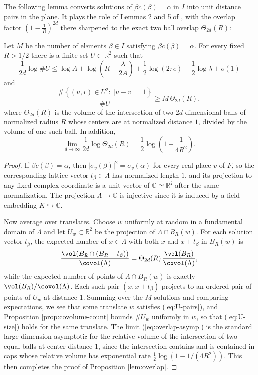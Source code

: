 The following lemma converts solutions of $\beta c(\beta)=\alpha$ in $I$ into unit distance pairs in the plane.  It plays the role of Lemmas 2 and 5 of \cite{Sawin}, with the overlap factor $(1-\frac{1}{R})^{2d}$ there sharpened to the exact two ball overlap $\Theta_{2d}(R)$:
\begin{proposition}\label{lem:overlap}
Let $M$ be the number of elements $\beta\in I$ satisfying $\beta c(\beta)=\alpha$.  For every fixed $R>1/2$ there is a finite set $U\subset\mathbb{R}^2$ such that
\begin{equation}\label{eq:U-size}
  \frac1{2d}\log\#U
  \leq
  \log A+\log\left(R+\frac{\lambda}{2A}\right)
  +\frac12\log(2\pi e)-\frac12\log\lambda+o(1)
\end{equation}
and
\begin{equation}\label{eq:U-pairs}
   \frac{\#\left\{(u,v)\in U^2:\ |u-v|=1\right\}}{\#U}
   \geq M\,\Theta_{2d}(R),
\end{equation}
where $\Theta_{2d}(R)$ is the volume of the intersection of two $2d$-dimensional balls of normalized radius $R$ whose centers are at normalized distance $1$, divided by the volume of one such ball.  In addition,
\begin{equation}\label{eq:overlap-asymp}
   \lim_{d\to\infty}\frac1{2d}\log\Theta_{2d}(R)
   =\frac12\log\left(1-\frac1{4R^2}\right).
\end{equation}
\end{proposition}

\begin{proof}
If $\beta c(\beta)=\alpha$, then $|\sigma_v(\beta)|^2=\sigma_v(\alpha)$ for every real place $v$ of $F$, so the corresponding lattice vector $t_\beta\in\Lambda$ has normalized length $1$, and its projection to any fixed complex coordinate is a unit vector of $\mathbb{C}\simeq\mathbb{R}^2$ after the same normalization.  The projection $\Lambda\to\mathbb{C}$ is injective since it is induced by a field embedding $K\hookrightarrow\mathbb{C}$.

Now average over translates.  Choose $w$ uniformly at random in a fundamental domain of $\Lambda$ and let $U_w\subset\mathbb{R}^2$ be the projection of $\Lambda\cap B_R(w)$.  For each solution vector $t_\beta$, the expected number of $x\in\Lambda$ with both $x$ and $x+t_\beta$ in $B_R(w)$ is
\[
   \frac{\vol(B_R\cap(B_R-t_\beta))}{\covol(\Lambda)}
   =\Theta_{2d}(R)\,\frac{\vol(B_R)}{\covol(\Lambda)},
\]
while the expected number of points of $\Lambda\cap B_R(w)$ is exactly $\vol(B_R)/\covol(\Lambda)$.  Each such pair $(x,x+t_\beta)$ projects to an ordered pair of points of $U_w$ at distance $1$.  Summing over the $M$ solutions and comparing expectations, we see that some translate $w$ satisfies (\ref{eq:U-pairs}), and Proposition \ref{prop:covolume-count} bounds $\#U_w$ uniformly in $w$, so that (\ref{eq:U-size}) holds for the same translate.  The limit (\ref{eq:overlap-asymp}) is the standard large dimension asymptotic for the relative volume of the intersection of two equal balls at center distance $1$, since the intersection contains and is contained in caps whose relative volume has exponential rate $\frac12\log(1-1/(4R^2))$.  This then completes the proof of Proposition \ref{lem:overlap}.
\end{proof}

